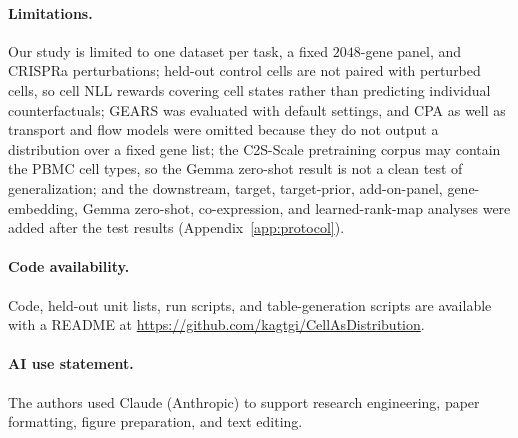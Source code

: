 \documentclass[10pt]{article}
\begin{document}
\paragraph{Limitations.}
Our study is limited to one dataset per task, a fixed $2048$-gene panel, and CRISPRa perturbations; held-out control cells are not paired with perturbed cells, so cell NLL rewards covering cell states rather than predicting individual counterfactuals; GEARS was evaluated with default settings, and CPA as well as transport and flow models were omitted because they do not output a distribution over a fixed gene list; the C2S-Scale pretraining corpus may contain the PBMC cell types, so the Gemma zero-shot result is not a clean test of generalization; and the downstream, target, target-prior, add-on-panel, gene-embedding, Gemma zero-shot, co-expression, and learned-rank-map analyses were added after the test results (Appendix~\ref{app:protocol}).

\paragraph{Code availability.} Code, held-out unit lists, run scripts, and table-generation scripts are available with a README at \url{https://github.com/kagtgi/CellAsDistribution}.
\paragraph{AI use statement.} The authors used Claude (Anthropic) to support research engineering, paper formatting, figure preparation, and text editing.

{

}
\end{document}
